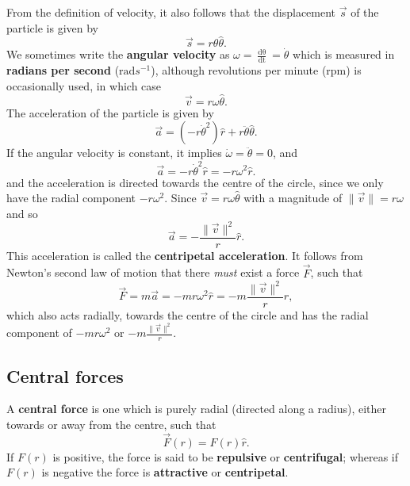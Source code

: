 From the definition of velocity, it also follows that the displacement $\vec{s}$ of the particle is given by
\begin{equation}
    \vec{s} = r \theta \hat{\theta}.
\end{equation}
We sometimes write the \textbf{angular velocity} as $\omega = \frac{\mathop{\mathrm{d}\theta}}{\mathop{\mathrm{d}t}} = \dot{\theta}$ which is measured in \textbf{radians per second} ($\text{rad} s^{-1}$), although revolutions per minute ($\text{rpm}$) is occasionally used, in which case
\begin{equation}
    \vec{v} = r \omega \hat{\theta}.
\end{equation}
The acceleration of the particle is given by
\begin{equation}
    \vec{a} = \left( -r\dot{\theta}^2\right) \hat{r} + r \ddot{\theta} \hat{\theta}.
\end{equation}
If the angular velocity is constant, it implies $\dot{\omega} = \ddot{\theta} = 0$, and 
\begin{equation}
    \vec{a} = -r \dot{\theta}^2 \hat{r} = -r \omega^2 \hat{r}.
\end{equation}
and the acceleration is directed towards the centre of the circle, since we only have the radial component $- r \omega^2$. Since $\vec{v} = r \omega \hat{\theta}$ with a magnitude of $\| \vec{v} \| = r \omega$ and so
\begin{equation}
    \vec{a} = - \frac{\| \vec{v} \|^2}{r} \hat{r}.
\end{equation}
This acceleration is called the \textbf{centripetal acceleration}. It follows from Newton's second law of motion that there \textit{must} exist a force $\vec{F}$, such that
\begin{equation}
    \vec{F} = m \vec{a} = - m r \omega^2 \hat{r} = - m \frac{\| \vec{v} \|^2}{r} \hat{r},
\end{equation}
which also acts radially, towards the centre of the circle and has the radial component of $- m r \omega^2$ or $- m \frac{\| \vec{v} \|^2}{r}$.

\subsection{Central forces}
\label{subsection:central-forces}
A \textbf{central force} is one which is purely radial (directed along a radius), either towards or away from the centre, such that
\begin{equation}
    \vec{F}(r) = F(r) \hat{r}.
\end{equation}
If $F(r)$ is positive, the force is said to be \textbf{repulsive} or \textbf{centrifugal}; whereas if $F(r)$ is negative the force is \textbf{attractive} or \textbf{centripetal}. 

